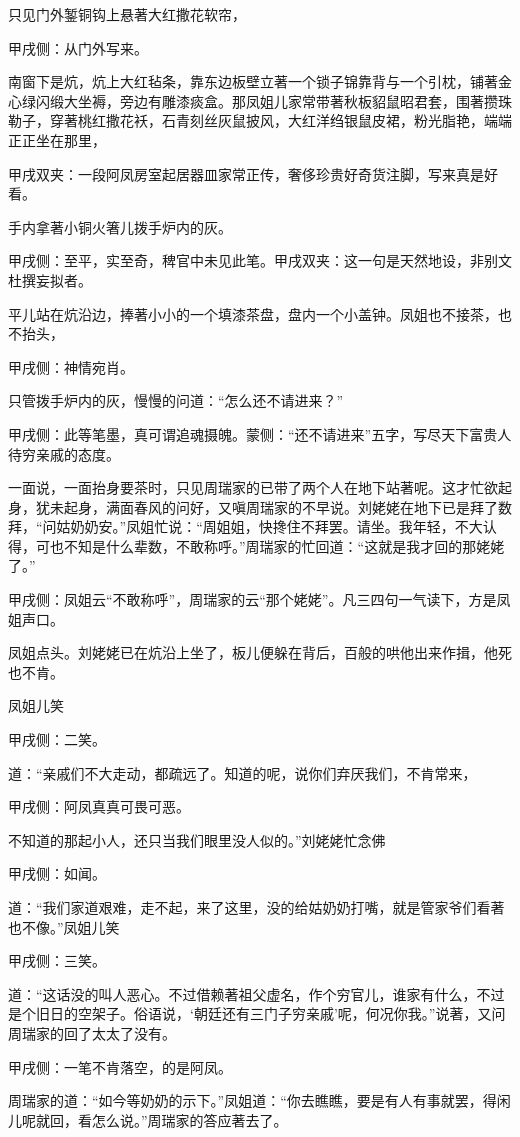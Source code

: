 \begin{parag}
    只见门外錾铜钩上悬著大红撒花软帘，\begin{note}甲戌侧：从门外写来。\end{note}南窗下是炕，炕上大红毡条，靠东边板壁立著一个锁子锦靠背与一个引枕，铺著金心绿闪缎大坐褥，旁边有雕漆痰盒。那凤姐儿家常带著秋板貂鼠昭君套，围著攒珠勒子，穿著桃红撒花袄，石青刻丝灰鼠披风，大红洋绉银鼠皮裙，粉光脂艳，端端正正坐在那里，\begin{note}甲戌双夹：一段阿凤房室起居器皿家常正传，奢侈珍贵好奇货注脚，写来真是好看。\end{note}手内拿著小铜火箸儿拨手炉内的灰。\begin{note}甲戌侧：至平，实至奇，稗官中未见此笔。甲戌双夹：这一句是天然地设，非别文杜撰妄拟者。\end{note}平儿站在炕沿边，捧著小小的一个填漆茶盘，盘内一个小盖钟。凤姐也不接茶，也不抬头，\begin{note}甲戌侧：神情宛肖。\end{note}只管拨手炉内的灰，慢慢的问道：“怎么还不请进来？”\begin{note}甲戌侧：此等笔墨，真可谓追魂摄魄。蒙侧：“还不请进来”五字，写尽天下富贵人待穷亲戚的态度。\end{note}一面说，一面抬身要茶时，只见周瑞家的已带了两个人在地下站著呢。这才忙欲起身，犹未起身，满面春风的问好，又嗔周瑞家的不早说。刘姥姥在地下已是拜了数拜，“问姑奶奶安。”凤姐忙说：“周姐姐，快搀住不拜罢。请坐。我年轻，不大认得，可也不知是什么辈数，不敢称呼。”周瑞家的忙回道：“这就是我才回的那姥姥了。”\begin{note}甲戌侧：凤姐云“不敢称呼”，周瑞家的云“那个姥姥”。凡三四句一气读下，方是凤姐声口。\end{note}凤姐点头。刘姥姥已在炕沿上坐了，板儿便躲在背后，百般的哄他出来作揖，他死也不肯。
\end{parag}


\begin{parag}
    凤姐儿笑\begin{note}甲戌侧：二笑。\end{note}道：“亲戚们不大走动，都疏远了。知道的呢，说你们弃厌我们，不肯常来，\begin{note}甲戌侧：阿凤真真可畏可恶。\end{note}不知道的那起小人，还只当我们眼里没人似的。”刘姥姥忙念佛\begin{note}甲戌侧：如闻。\end{note}道：“我们家道艰难，走不起，来了这里，没的给姑奶奶打嘴，就是管家爷们看著也不像。”凤姐儿笑\begin{note}甲戌侧：三笑。\end{note}道：“这话没的叫人恶心。不过借赖著祖父虚名，作个穷官儿，谁家有什么，不过是个旧日的空架子。俗语说，‘朝廷还有三门子穷亲戚’呢，何况你我。”说著，又问周瑞家的回了太太了没有。\begin{note}甲戌侧：一笔不肯落空，的是阿凤。\end{note}周瑞家的道：“如今等奶奶的示下。”凤姐道：“你去瞧瞧，要是有人有事就罢，得闲儿呢就回，看怎么说。”周瑞家的答应著去了。
\end{parag}


